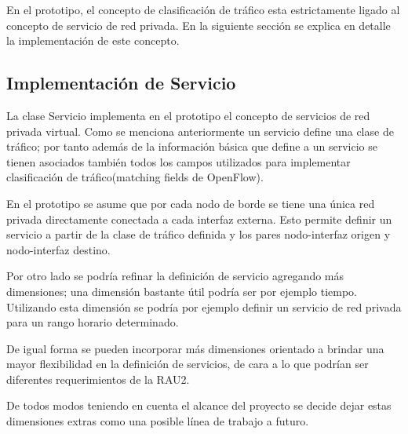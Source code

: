 En el prototipo, el concepto de clasificaci\'on de tr\'afico esta estrictamente ligado al concepto de servicio de red privada. En la siguiente secci\'on se explica en detalle la implementaci\'on de este concepto.
 
\subsection{Implementación de Servicio}

La clase Servicio implementa en el prototipo el concepto de servicios de red privada virtual. Como se menciona anteriormente un servicio define una clase de tr\'afico; por tanto adem\'as de la informaci\'on b\'asica que define a un servicio se tienen asociados tambi\'en todos los campos utilizados para implementar clasificaci\'on de tr\'afico(matching fields de OpenFlow).

En el prototipo se asume que por cada nodo de borde  se tiene una \'unica red privada directamente conectada a cada interfaz externa. Esto permite definir un servicio a partir de la clase de tr\'afico definida y los pares nodo-interfaz origen y nodo-interfaz destino.

Por otro lado se podr\'ia refinar la definici\'on de servicio agregando m\'as dimensiones; una dimensi\'on bastante \'util podr\'ia ser por ejemplo tiempo. Utilizando esta dimensi\'on se podr\'ia por ejemplo definir un servicio de red privada para un rango horario determinado.

De igual forma se pueden incorporar m\'as dimensiones orientado a brindar una mayor flexibilidad en la definici\'on de servicios, de cara a lo que podr\'ian ser diferentes requerimientos de la RAU2. 

De todos modos teniendo en cuenta el alcance del proyecto se decide dejar estas dimensiones extras como una posible l\'inea de trabajo a futuro.\\ 






